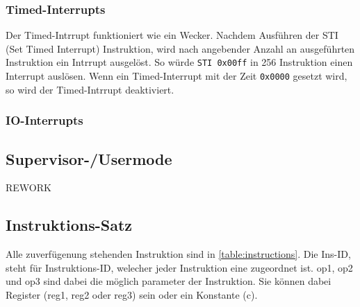 \documentclass{scrartcl}
\begin{document}
\subsubsection{Timed-Interrupts}

Der Timed-Intrrupt funktioniert wie ein Wecker. Nachdem Ausführen der STI (Set Timed Interrupt) Instruktion, wird nach angebender Anzahl an ausgeführten Instruktion ein Intrrupt ausgelöst. So 
würde \texttt{STI 0x00ff} in 256 Instruktion einen Interrupt auslösen. Wenn ein Timed-Interrupt mit der Zeit \texttt{0x0000} gesetzt wird, so wird der Timed-Intrrupt deaktiviert.

\subsubsection{IO-Interrupts}

\subsection{\label{section:supervisor}Supervisor-/Usermode}

REWORK

\subsection{\label{section:insSet}Instruktions-Satz}

Alle zuverfügenung stehenden Instruktion sind in \autoref{table:instructions}. Die Ins-ID, steht für Instruktions-ID, welecher jeder Instruktion eine zugeordnet ist. op1, op2 und op3 sind dabei die möglich parameter der Instruktion. Sie können dabei Register (reg1, reg2 oder reg3) sein oder ein Konstante (c).
\end{document}
